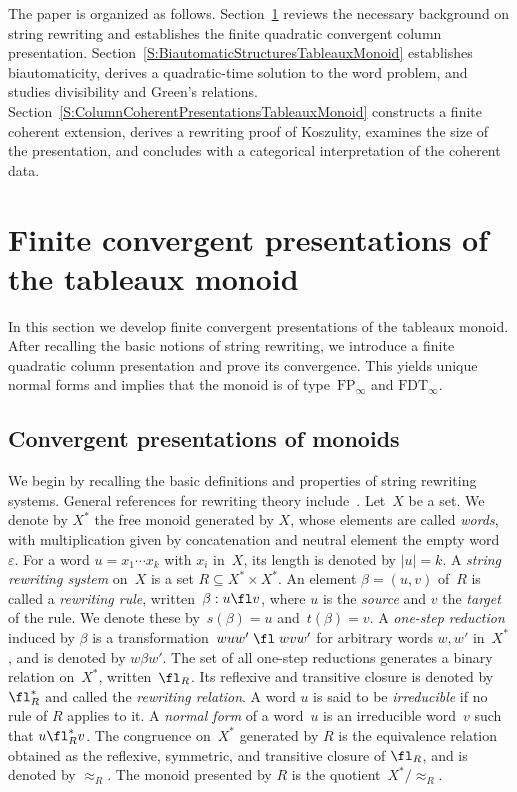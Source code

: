 \documentclass[a4paper, twoside, 11pt, english]{article}
\begin{document}
The paper is organized as follows. Section~\ref{S:ColumnPresentationsTableauxMonoid} reviews the necessary background on string rewriting and establishes the finite quadratic convergent column presentation. 
Section~\ref{S:BiautomaticStructuresTableauxMonoid} establishes biautomaticity, derives a quadratic-time solution to the word problem, and studies divisibility and Green's relations. Section~\ref{S:ColumnCoherentPresentationsTableauxMonoid} constructs a finite coherent extension, derives a rewriting proof of Koszulity, examines the size of the presentation, and concludes with a categorical interpretation of the coherent data.



\section{Finite convergent presentations of the tableaux monoid}
\label{S:ColumnPresentationsTableauxMonoid}

In this section we develop finite convergent presentations of the tableaux monoid.
After recalling the basic notions of string rewriting, we introduce a finite
quadratic column presentation and prove its convergence.
This yields unique normal forms and implies that the monoid is of type~$\mathrm{FP}_\infty$ and $\mathrm{FDT}_\infty$.

\subsection{Convergent presentations of monoids}
\label{SS:ConvergentPresentations}
We begin by recalling the basic definitions and properties of string rewriting systems.
General references for rewriting theory include~\cite{BookOtto93}. 
Let~$X$ be a set.
We denote by $X^\ast$ the free monoid generated by $X$, whose elements are called \emph{words},
with multiplication given by concatenation and neutral element the empty word~$\varepsilon$.
For a word $u = x_1 \cdots x_k$ with $x_i$ in~$X$, its length is denoted by $|u| = k$.
A \emph{string rewriting system} on~$X$ is a set $R \subseteq X^\ast \times X^\ast$.
An element $\beta = (u,v)$ of~$R$ is called a \emph{rewriting rule}, written~$\beta : u \fl v$,
where $u$ is the \emph{source} and $v$ the \emph{target} of the rule.
We denote these by~$s(\beta)=u$ and~$t(\beta)=v$.
A \emph{one-step reduction} induced by $\beta$ is a transformation~$wuw' \;\fl\; wvw'$
for arbitrary words $w,w'$  in~$X^\ast$, and is denoted by $w\beta w'$.
The set of all one-step reductions generates a binary relation on~$X^\ast$, written~$\fl_R$.
Its reflexive and transitive closure is denoted by~$\fl_R^\ast$ and called the \emph{rewriting relation}.
A word $u$ is said to be \emph{irreducible} if no rule of $R$ applies to it.
A \emph{normal form} of a word~$u$ is an irreducible word~$v$ such that $u \fl_R^\ast v$. 
The congruence on~$X^\ast$ generated by $R$ is the equivalence relation
obtained as the reflexive, symmetric, and transitive closure of $\fl_R$,
and is denoted by $\approx_R$.
The monoid presented by $R$ is the quotient~$X^\ast / \!\approx_R$.
\end{document}
